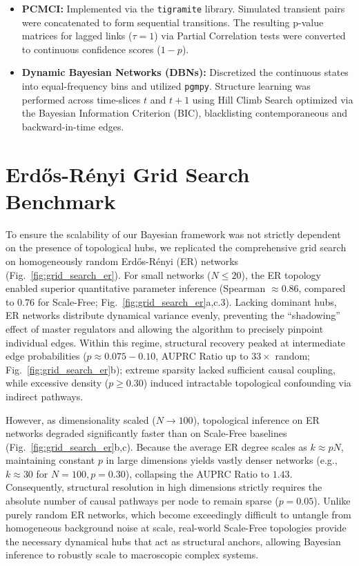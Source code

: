 \documentclass[10pt, aps, rmp,  twocolumn, superscriptaddress, floatfix, showkeys]{revtex4-2}
\begin{document}
\begin{itemize}
    \item \textbf{PCMCI:} Implemented via the \texttt{tigramite} library. Simulated transient pairs were concatenated to form sequential transitions. The resulting p-value matrices for lagged links ($\tau = 1$) via Partial Correlation tests were converted to continuous confidence scores ($1 - p$).
    \item \textbf{Dynamic Bayesian Networks (DBNs):} Discretized the continuous states into equal-frequency bins and utilized \texttt{pgmpy}. Structure learning was performed across time-slices $t$ and $t+1$ using Hill Climb Search optimized via the Bayesian Information Criterion (BIC), blacklisting contemporaneous and backward-in-time edges.
\end{itemize}


\section{Erd\H{o}s-R\'enyi Grid Search Benchmark}



To ensure the scalability of our Bayesian framework was not strictly dependent on the presence of topological hubs, we replicated the comprehensive grid search on homogeneously random Erd\H{o}s-R\'enyi (ER) networks (Fig.~\ref{fig:grid_search_er}). For small networks ($N \le 20$), the ER topology enabled superior quantitative parameter inference (Spearman $\approx 0.86$, compared to $0.76$ for Scale-Free; Fig.~\ref{fig:grid_search_er}a,c.3). Lacking dominant hubs, ER networks distribute dynamical variance evenly, preventing the ``shadowing'' effect of master regulators and allowing the algorithm to precisely pinpoint individual edges. Within this regime, structural recovery peaked at intermediate edge probabilities ($p \approx 0.075 - 0.10$, AUPRC Ratio up to $33\times$ random; Fig.~\ref{fig:grid_search_er}b); extreme sparsity lacked sufficient causal coupling, while excessive density ($p \ge 0.30$) induced intractable topological confounding via indirect pathways. 

However, as dimensionality scaled ($N \to 100$), topological inference on ER networks degraded significantly faster than on Scale-Free baselines (Fig.~\ref{fig:grid_search_er}b,c). Because the average ER degree scales as $k \approx pN$, maintaining constant $p$ in large dimensions yields vastly denser networks (e.g., $k \approx 30$ for $N=100, p=0.30$), collapsing the AUPRC Ratio to $1.43$. Consequently, structural resolution in high dimensions strictly requires the absolute number of causal pathways per node to remain sparse ($p=0.05$). Unlike purely random ER networks, which become exceedingly difficult to untangle from homogeneous background noise at scale, real-world Scale-Free topologies provide the necessary dynamical hubs that act as structural anchors, allowing Bayesian inference to robustly scale to macroscopic complex systems.
\end{document}
